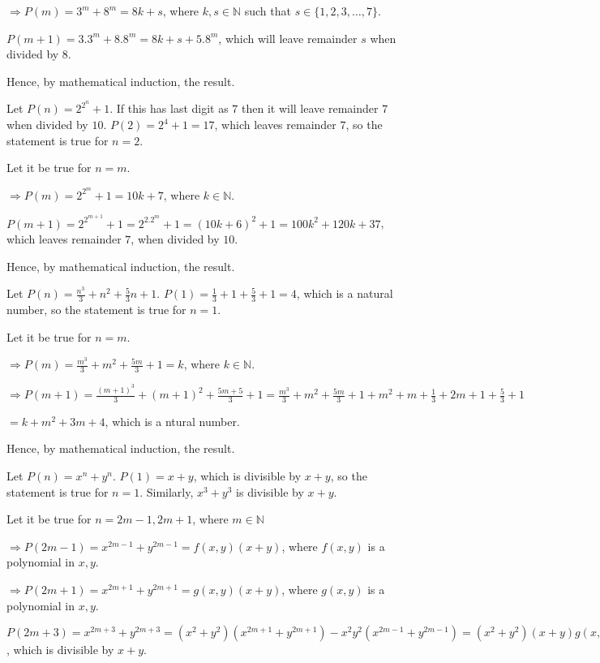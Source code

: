   $\Rightarrow P(m) = 3^m + 8^m = 8k + s$, where $k,s\in\mathbb{N}$ such that $s\in\{1,2,3, \ldots, 7\}$.

  $P(m + 1) = 3.3^m + 8.8^m = 8k + s + 5.8^m$, which will leave remainder $s$ when divided by $8$.

  Hence, by mathematical induction, the result.
\item Let $P(n) = 2^{2^n} + 1$. If this has last digit as $7$ then it will leave remainder $7$ when divided
  by $10$. $P(2) = 2^4 + 1 = 17$, which leaves remainder $7$, so the statement is true for $n = 2$.

  Let it be true for $n = m$.

  $\Rightarrow P(m) = 2^{2^m} + 1 = 10k + 7$, where $k\in\mathbb{N}$.

  $P(m + 1) = 2^{2^{m + 1}} + 1 = 2^{2.2^m} + 1 = (10 k + 6)^2 + 1 = 100k^2 + 120k + 37$, which leaves
  remainder $7$, when divided by $10$.

  Hence, by mathematical induction, the result.
\item Let $P(n) = \frac{n^3}{3} + n^2 + \frac{5}{3}n + 1$. $P(1) = \frac{1}{3} + 1 + \frac{5}{3} + 1 = 4$, which
  is a natural number, so the statement is true for $n = 1$.

  Let it be true for $n = m$.

  $\Rightarrow P(m) = \frac{m^3}{3} + m^2 + \frac{5m}{3} + 1 = k$, where $k\in\mathbb{N}$.

  $\Rightarrow P(m + 1) = \frac{(m + 1)^3}{3} + (m + 1)^2 + \frac{5m + 5}{3} + 1 = \frac{m^3}{3} + m^2 +
  \frac{5m}{3} + 1 + m^2 + m + \frac{1}{3} + 2m + 1 + \frac{5}{3} + 1$

  $= k + m^2 + 3m + 4$, which is a ntural number.

  Hence, by mathematical induction, the result.
\item Let $P(n) = x^n + y^n$. $P(1) = x + y$, which is divisible by $x + y$, so the statement is true for $n
  = 1$. Similarly, $x^3 + y^3$ is divisible by $x + y$.

  Let it be true for $n = 2m - 1, 2m + 1$, where $m\in\mathbb{N}$

  $\Rightarrow P(2m - 1) = x^{2m - 1} + y^{2m - 1} = f(x, y)(x + y)$, where $f(x, y)$ is a polynomial in $x,
  y$.

  $\Rightarrow P(2m + 1) = x^{2m + 1} + y^{2m + 1} = g(x, y)(x + y)$, where $g(x, y)$ is a polynomial in $x,
  y$.

  $P(2m + 3) = x^{2m + 3} + y^{2m + 3} = (x^2 + y^2)(x^{2m + 1} + y^{2m + 1}) - x^2y^2(x^{2m - 1} + y^{2m -
    1}) = (x^2 + y^2)(x + y)g(x, y) - x^2y^2(x + y)f(x, y)$, which is divisible by $x + y$.


